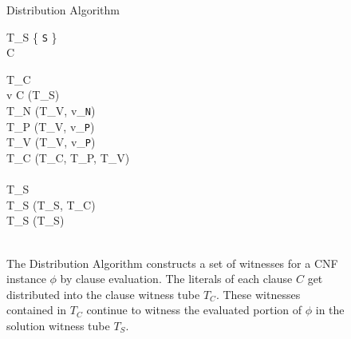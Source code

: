 
\begin{figure}[htbp]
	\renewcommand{\figurename}{Algorithm}
	\renewcommand{\thepseudocode}{\ref{distributionAlgorithm}}
	
	\begin{center}

	\begin{pseudocode}[shadowbox]{Distribution Algorithm}{\phi}
	
	T_S \GETS \{ \texttt{S} \} \\
	
	\FOREACH {} C  \phi \DO
		\BEGIN 
		
			T_C \GETS \emptyset \\
			\FOREACH {} v  C \DO
				\BEGIN
					[T_V, T_S] \GETS {}(T_S) \\
					T_N \GETS {}(T_V, v_{\texttt{N}})\\
					T_P \GETS {}(T_V, v_{\texttt{P}})\\
					T_V \GETS {}(T_V, v_{\texttt{P}})\\
					T_C \GETS {}(T_C, T_P, T_V)\\
				\END\\
				T_S \GETS \emptyset\\
				T_S \GETS {}(T_S, T_C)\\
				T_S \GETS {}(T_S)\\
		\END\\
	\end{pseudocode}

\caption{The {\sc Distribution Algorithm} constructs a set of witnesses for a CNF instance $\phi$ by clause evaluation.  The literals of each clause $C$ get distributed into the clause witness tube $T_C$.  These witnesses contained in $T_C$ continue to witness the evaluated portion of $\phi$ in the solution witness tube $T_S$.  }
\label{distributionAlgorithm}
\end{center}
\end{figure}

